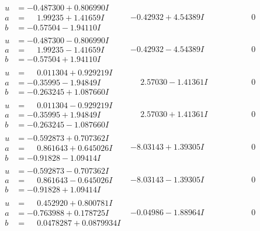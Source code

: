 \documentclass[1p]{elsarticle_modified}
\theoremstyle{definition}
\begin{document}
$$\begin{array}{c|c|c}
\begin{aligned}
u &= -0.487300 + 0.806990 I \\
a &= \phantom{-}1.99235 + 1.41659 I \\
b &= -0.57504 - 1.94110 I\end{aligned}
 & -0.42932 + 4.54389 I & \phantom{-0.000000 } 0 \\ \hline\begin{aligned}
u &= -0.487300 - 0.806990 I \\
a &= \phantom{-}1.99235 - 1.41659 I \\
b &= -0.57504 + 1.94110 I\end{aligned}
 & -0.42932 - 4.54389 I & \phantom{-0.000000 } 0 \\ \hline\begin{aligned}
u &= \phantom{-}0.011304 + 0.929219 I \\
a &= -0.35995 - 1.94849 I \\
b &= -0.263245 + 1.087660 I\end{aligned}
 & \phantom{-}2.57030 - 1.41361 I & \phantom{-0.000000 } 0 \\ \hline\begin{aligned}
u &= \phantom{-}0.011304 - 0.929219 I \\
a &= -0.35995 + 1.94849 I \\
b &= -0.263245 - 1.087660 I\end{aligned}
 & \phantom{-}2.57030 + 1.41361 I & \phantom{-0.000000 } 0 \\ \hline\begin{aligned}
u &= -0.592873 + 0.707362 I \\
a &= \phantom{-}0.861643 + 0.645026 I \\
b &= -0.91828 - 1.09414 I\end{aligned}
 & -8.03143 + 1.39305 I & \phantom{-0.000000 } 0 \\ \hline\begin{aligned}
u &= -0.592873 - 0.707362 I \\
a &= \phantom{-}0.861643 - 0.645026 I \\
b &= -0.91828 + 1.09414 I\end{aligned}
 & -8.03143 - 1.39305 I & \phantom{-0.000000 } 0 \\ \hline\begin{aligned}
u &= \phantom{-}0.452920 + 0.800781 I \\
a &= -0.763988 + 0.178725 I \\
b &= \phantom{-}0.0478287 + 0.0879934 I\end{aligned}
 & -0.04986 - 1.88964 I & \phantom{-0.000000 } 0 \\ \hline\begin{aligned}

\end{aligned}
\end{array}$$
\end{document}

